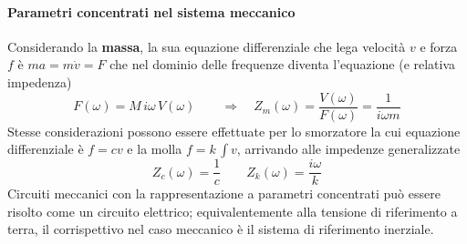 	\paragraph{Parametri concentrati nel sistema meccanico} Considerando la \textbf{massa}, la sua equazione differenziale che lega velocità $v$ e forza $f$ è $ma = m\dot v = F$ che nel dominio delle frequenze diventa l'equazione (e relativa impedenza)
	\begin{equation}
		F(\omega) = M\, i\omega\, V(\omega) \qquad \Rightarrow\quad Z_m (\omega) = \frac{V(\omega)}{F(\omega)} = \frac{1}{i\omega m}
	\end{equation}
	Stesse considerazioni possono essere effettuate per lo smorzatore la cui equazione differenziale è $f = cv$ e la molla $f = k \, \int v$, arrivando alle impedenze generalizzate
	\[ Z_c(\omega) = \frac 1 c \qquad Z_k(\omega) = \frac {i\omega} k \]
	Circuiti meccanici con la rappresentazione a parametri concentrati può essere risolto come un circuito elettrico; equivalentemente alla tensione di riferimento a terra, il corrispettivo nel caso meccanico è il sistema di riferimento inerziale.
	
	
	
	
	
	
	
	
	
	
	
	
	
	